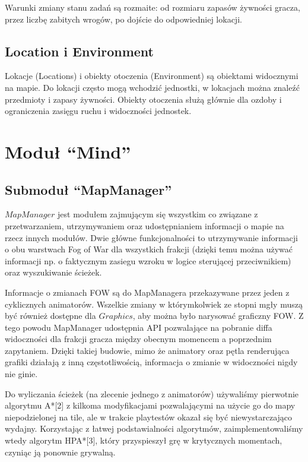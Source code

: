 \documentclass[licencjacka]{pracamgr}
\begin{document}
      Warunki zmiany stanu zadań są rozmaite: od rozmiaru zapasów żywności gracza, przez liczbę zabitych wrogów, po
      dojście do odpowiedniej lokacji.

    \subsection{Location i Environment}
      Lokacje (Locations) i obiekty otoczenia (Environment) są obiektami widocznymi na mapie. Do lokacji często mogą
      wchodzić jednostki, w lokacjach można znaleźć przedmioty i zapasy żywności. Obiekty otoczenia służą głównie dla
      ozdoby i ograniczenia zasięgu ruchu i widoczności jednostek.

  \section{Moduł ``Mind''}
    \subsection{Submoduł ``MapManager''}
    $MapManager$ jest modułem zajmującym się wszystkim co związane z przetwarzaniem, utrzymywaniem oraz udostępnianiem
    informacji o mapie na rzecz innych modułów. Dwie główne funkcjonalności to utrzymywanie informacji o obu warstwach
    Fog of War dla wszystkich frakcji (dzięki temu można używać informacji np. o faktycznym zasiegu wzroku w logice
    sterującej przeciwnikiem) oraz wyszukiwanie ścieżek.

    Informacje o zmianach FOW są do MapManagera przekazywane przez jeden z cyklicznych animatorów. Wszelkie zmiany
    w którymkolwiek ze stopni mgły muszą być również dostępne dla $Graphics$, aby można było narysować graficzny FOW. Z
    tego powodu MapManager udostępnia API pozwalające na pobranie diffa widoczności dla frakcji gracza między obecnym
    momencem a poprzednim zapytaniem. Dzięki takiej budowie, mimo że animatory oraz pętla renderująca grafiki działają
    z inną częstotliwością, informacja o zmianie w widoczności nigdy nie ginie.

    Do wyliczania ścieżek (na zlecenie jednego z animatorów) używaliśmy pierwotnie algorytmu A*[2] z kilkoma
    modyfikacjami pozwalającymi na użycie go do mapy niepodzielonej na tile, ale w trakcie playtestów okazał się być
    niewystarczająco wydajny. Korzystając z łatwej podstawialności algorytmów, zaimplementowaliśmy wtedy algorytm
    HPA*[3], który przyspieszył grę w krytycznych momentach, czyniąc ją ponownie grywalną.
\end{document}
